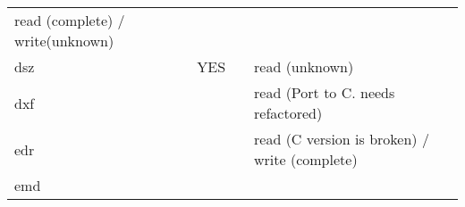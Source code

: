 \begin{longtable}[]{@{}llll@{}}
\begin{minipage}[t]{0.22\columnwidth}
read (complete) / write(unknown)\strut
\end{minipage}\tabularnewline
\begin{minipage}[t]{0.19\columnwidth}\raggedright
dsz\strut
\end{minipage} & \begin{minipage}[t]{0.22\columnwidth}\raggedright
YES\strut
\end{minipage} & \begin{minipage}[t]{0.25\columnwidth}\raggedright
\strut
\end{minipage} & \begin{minipage}[t]{0.22\columnwidth}\raggedright
read (unknown)\strut
\end{minipage}\tabularnewline
\begin{minipage}[t]{0.19\columnwidth}\raggedright
dxf\strut
\end{minipage} & \begin{minipage}[t]{0.22\columnwidth}\raggedright
\strut
\end{minipage} & \begin{minipage}[t]{0.25\columnwidth}\raggedright
\strut
\end{minipage} & \begin{minipage}[t]{0.22\columnwidth}\raggedright
read (Port to C. needs refactored)\strut
\end{minipage}\tabularnewline
\begin{minipage}[t]{0.19\columnwidth}\raggedright
edr\strut
\end{minipage} & \begin{minipage}[t]{0.22\columnwidth}\raggedright
\strut
\end{minipage} & \begin{minipage}[t]{0.25\columnwidth}\raggedright
\strut
\end{minipage} & \begin{minipage}[t]{0.22\columnwidth}\raggedright
read (C version is broken) / write (complete)\strut
\end{minipage}\tabularnewline
\begin{minipage}[t]{0.19\columnwidth}\raggedright
emd\strut
\end{minipage} & \begin{minipage}[t]{0.22\columnwidth}\raggedright
\strut
\end{minipage} & \begin{minipage}[t]{0.25\columnwidth}\raggedright
\strut
\end{minipage} & \begin{minipage}[t]{0.22\columnwidth}\raggedright

\end{minipage}
\end{longtable}
